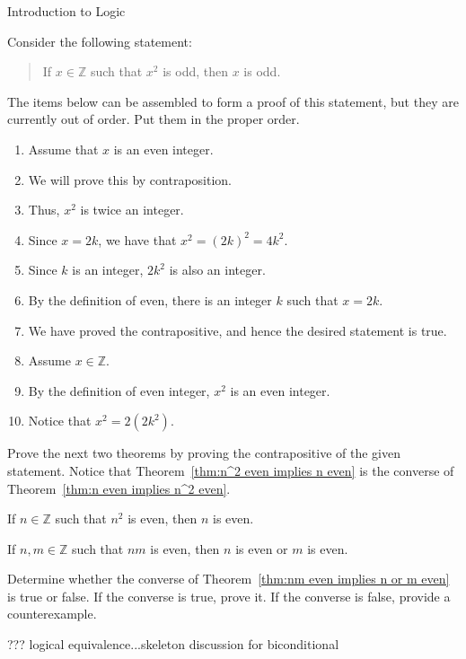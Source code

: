 \begin{section}{Introduction to Logic}
\begin{problem}
Consider the following statement:
\begin{quote}
If $x\in\mathbb{Z}$ such that $x^2$ is odd, then $x$ is odd.
\end{quote}
The items below can be assembled to form a proof of this statement, but they are currently out of order.  Put them in the proper order.
\begin{enumerate}
\item Assume that $x$ is an even integer.
\item We will prove this by contraposition.
\item Thus, $x^2$ is twice an integer.
\item Since $x=2k$, we have that $x^2 =(2k)^2 =4k^2$.
\item Since $k$ is an integer, $2k^2$ is also an integer.
\item By the definition of even, there is an integer $k$ such that $x=2k$.
\item We have proved the contrapositive, and hence the desired statement is true.
\item Assume $x\in \mathbb{Z}$.
\item By the definition of even integer, $x^2$ is an even integer.
\item Notice that $x^2 = 2(2k^2)$.
\end{enumerate}
\end{problem}

Prove the next two theorems by proving the contrapositive of the given statement. Notice that Theorem~\ref{thm:n^2 even implies n even} is the converse of Theorem~\ref{thm:n even implies n^2 even}.

\begin{theorem}\label{thm:n^2 even implies n even}
If $n\in\mathbb{Z}$ such that $n^2$ is even, then $n$ is even.
\end{theorem}


\begin{theorem}\label{thm:nm even implies n or m even}
If $n,m\in\mathbb{Z}$ such that $nm$ is even, then $n$ is even or $m$ is even.
\end{theorem}

\begin{problem}
Determine whether the converse of Theorem~\ref{thm:nm even implies n or m even} is true or false.  If the converse is true, prove it. If the converse is false, provide a counterexample.
\end{problem}

??? logical equivalence...skeleton discussion for biconditional

\end{section}